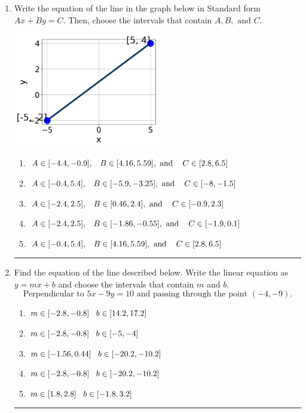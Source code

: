 \documentclass[14pt]{extbook}
\newcommand{\litem}[1]{\item#1\hspace*{-1cm}\rule{\textwidth}{0.4pt}}
\begin{document}
\begin{enumerate}
\litem{
Write the equation of the line in the graph below in Standard form $Ax+By=C$. Then, choose the intervals that contain $A, B, \text{ and } C$.
\begin{center}
    \includegraphics[width=0.5\textwidth]{../Figures/linearGraphToStandardC.png}
\end{center}
\begin{enumerate}[label=\Alph*.]
\item \( A \in [-4.4, -0.9], \hspace{3mm} B \in [4.16, 5.59], \text{ and } \hspace{3mm} C \in [2.8, 6.5] \)
\item \( A \in [-0.4, 5.4], \hspace{3mm} B \in [-5.9, -3.25], \text{ and } \hspace{3mm} C \in [-8, -1.5] \)
\item \( A \in [-2.4, 2.5], \hspace{3mm} B \in [0.46, 2.4], \text{ and } \hspace{3mm} C \in [-0.9, 2.3] \)
\item \( A \in [-2.4, 2.5], \hspace{3mm} B \in [-1.86, -0.55], \text{ and } \hspace{3mm} C \in [-1.9, 0.1] \)
\item \( A \in [-0.4, 5.4], \hspace{3mm} B \in [4.16, 5.59], \text{ and } \hspace{3mm} C \in [2.8, 6.5] \)

\end{enumerate} }
\litem{
Find the equation of the line described below. Write the linear equation as $ y=mx+b $ and choose the intervals that contain $m$ and $b$.\[ \text{Perpendicular to } 5 x - 9 y = 10 \text{ and passing through the point } (-4, -9). \]\begin{enumerate}[label=\Alph*.]
\item \( m \in [-2.8, -0.8] \hspace*{3mm} b \in [14.2, 17.2] \)
\item \( m \in [-2.8, -0.8] \hspace*{3mm} b \in [-5, -4] \)
\item \( m \in [-1.56, 0.44] \hspace*{3mm} b \in [-20.2, -10.2] \)
\item \( m \in [-2.8, -0.8] \hspace*{3mm} b \in [-20.2, -10.2] \)
\item \( m \in [1.8, 2.8] \hspace*{3mm} b \in [-1.8, 3.2] \)


\end{enumerate}}
\end{enumerate}
\end{document}
